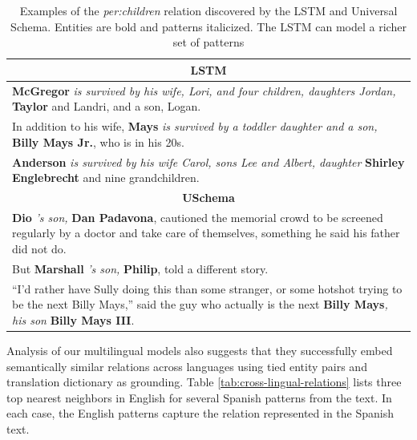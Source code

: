 \begin{table}[h]
\begin{center}
\small
\begin{tabular}{|p{7.6cm}|}
\hline
\multicolumn{1}{|c|}{\textbf{LSTM}} \\ \hline
{\bf McGregor} \emph{is survived by his wife, Lori, and four children, daughters Jordan,} { \bf Taylor} and Landri, and a son, Logan. \\ \hline
In addition to his wife, {\bf Mays} \emph{is survived by a toddler daughter and a son,} {\bf Billy Mays Jr.}, who is in his 20s. \\ \hline
{\bf Anderson} \emph{is survived by his wife Carol, sons Lee and Albert, daughter} {\bf Shirley Englebrecht} and nine grandchildren. \\
\hline\hline
\multicolumn{1}{|c|}{\textbf{USchema}}  \\ \hline
{\bf Dio} \emph{'s son,} {\bf Dan Padavona}, cautioned the memorial crowd to be screened regularly by a doctor and take care of themselves, something he said his father did not do. \\ \hline
But {\bf Marshall} \emph{'s son,} {\bf Philip}, told a different story.  \\ \hline
``I'd rather have Sully doing this than some stranger, or some hotshot trying to
be the next Billy Mays,'' said the guy who actually is the next {\bf Billy Mays}\emph{, his son} {\bf Billy Mays III}. \\ 
\hline
\end{tabular}
\caption{Examples of the \emph{per:children} relation discovered by the LSTM and Universal Schema. Entities are bold and patterns italicized. The LSTM can model a richer set of patterns \label{tab:lstm-us-similar-rels}}
\end{center}
\end{table}

Analysis of our multilingual models also suggests that they successfully embed semantically similar relations across languages using tied entity pairs and translation dictionary as grounding. Table \ref{tab:cross-lingual-relations} lists three top nearest neighbors in English for several Spanish patterns from the text. In each case, the English patterns capture the relation represented in the Spanish text. 

